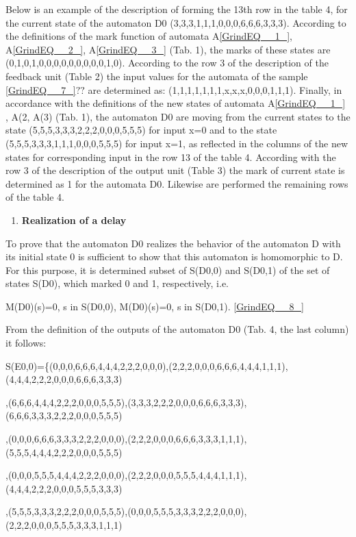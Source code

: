 \documentclass{article}
\begin{document}
Below is an example of the description of forming the 13th row in the table 4, for the current state of the automaton D0 (3,3,3,1,1,1,0,0,0,6,6,6,3,3,3). According to the definitions of the mark function of automata A\eqref{GrindEQ__1_}, A\eqref{GrindEQ__2_}, A\eqref{GrindEQ__3_} (Tab. 1), the marks of these states are (0,1,0,1,0,0,0,0,0,0,0,0,0,1,0). According to the row 3 of the description of the feedback unit (Table 2) the input values for the automata of the sample \eqref{GrindEQ__7_}$?$$?$ are determined as: (1,1,1,1,1,1,1,x,x,x,0,0,0,1,1,1). Finally, in accordance with the definitions of the new states of automata A\eqref{GrindEQ__1_} , A(2, A(3) (Tab. 1), the automaton D0 are moving from the current states to the state (5,5,5,3,3,3,2,2,2,0,0,0,5,5,5) for input x=0 and to the state (5,5,5,3,3,3,1,1,1,0,0,0,5,5,5) for input x=1, as reflected in the columns of the new states for corresponding input in the row 13 of the table 4. According with the row 3 of the description of the output unit (Table 3) the mark of current state is determined as 1 for the automata D0.  Likewise are performed the remaining rows of the table 4.

\begin{enumerate}
\item  \textbf{Realization of a delay}
\end{enumerate}

To prove that the automaton D0 realizes the behavior of the automaton D with its initial state 0 is sufficient to show that this automaton is homomorphic to D. For this purpose, it is determined subset of S(D0,0) and S(D0,1) of the set of states S(D0), which marked 0 and 1, respectively, i.e.

M(D0)(s)=0, s in S(D0,0), M(D0)(s)=0, s in S(D0,1). \eqref{GrindEQ__8_}

From the definition of the outputs of the automaton D0 (Tab. 4, the last column) it follows:

S(E0,0)=\{(0,0,0,6,6,6,4,4,4,2,2,2,0,0,0),(2,2,2,0,0,0,6,6,6,4,4,4,1,1,1),(4,4,4,2,2,2,0,0,0,6,6,6,3,3,3)

 ,(6,6,6,4,4,4,2,2,2,0,0,0,5,5,5),(3,3,3,2,2,2,0,0,0,6,6,6,3,3,3),(6,6,6,3,3,3,2,2,2,0,0,0,5,5,5)

 ,(0,0,0,6,6,6,3,3,3,2,2,2,0,0,0),(2,2,2,0,0,0,6,6,6,3,3,3,1,1,1),(5,5,5,4,4,4,2,2,2,0,0,0,5,5,5)

 ,(0,0,0,5,5,5,4,4,4,2,2,2,0,0,0),(2,2,2,0,0,0,5,5,5,4,4,4,1,1,1),(4,4,4,2,2,2,0,0,0,5,5,5,3,3,3)

 ,(5,5,5,3,3,3,2,2,2,0,0,0,5,5,5),(0,0,0,5,5,5,3,3,3,2,2,2,0,0,0),(2,2,2,0,0,0,5,5,5,3,3,3,1,1,1)
\end{document}
